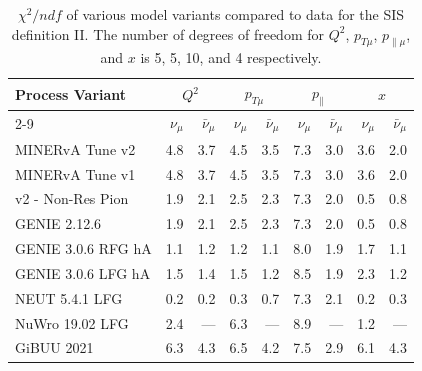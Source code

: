 \documentclass[aps, prd, twocolumn, showpacs, superscriptaddress, floatfix]{revtex4-2}
\begin{document}
\begin{table}[htbp]
	\centering
	\begin{tabular}{lrrrrrrrr}
        \hline\hline
		\multirow{2}{*}{Process Variant}  &	\multicolumn{2}{c}{\textbf{$Q^2$}} & \multicolumn{2}{c}{\textbf{$p_{T\mu}$}} & \multicolumn{2}{c}{\textbf{$p_{\parallel}$}} & \multicolumn{2}{c}{\textbf{$x$}}  \\  \cline{2-9}
		\multicolumn{1}{c}{}  &	$\nu_\mu$	&	$\bar{\nu}_\mu$	& $\nu_\mu$   &  $\bar{\nu}_\mu$	&	$\nu_\mu$	&	$\bar{\nu}_\mu$   & $\nu_\mu$  &  $\bar{\nu}_\mu$     \\	\hline
        MINERvA Tune v2     & 4.8		& 3.7      & 4.5     & 3.5		& 7.3     &	3.0    & 3.6     &	2.0   \\
        MINERvA Tune v1     & 4.8		& 3.7      & 4.5     & 3.5		& 7.3     &	3.0    & 3.6     &	2.0   \\
		v2 - Non-Res Pion   & 1.9		& 2.1	   & 2.5	 & 2.3	    & 7.3     &	2.0    & 0.5     &	0.8   \\ 
		GENIE 2.12.6        & 1.9		& 2.1      & 2.5	 & 2.3	    & 7.3     &	2.0    & 0.5     &  0.8   \\ \hline
		GENIE 3.0.6 RFG hA  & 1.1		& 1.2      & 1.2	 & 1.1		& 8.0     &	1.9    & 1.7     &	1.1   \\
		GENIE 3.0.6 LFG hA  & 1.5		& 1.4      & 1.5	 & 1.2		& 8.5     &	1.9    & 2.3     &	1.2   \\
		NEUT 5.4.1 LFG      & 0.2		& 0.2      & 0.3     & 0.7		& 7.3     & 2.1    & 0.2     &	0.3   \\
		NuWro 19.02 LFG     & 2.4		& ---      & 6.3     & ---      & 8.9     & ---    & 1.2     &	---   \\
        GiBUU 2021          & 6.3		& 4.3      & 6.5     & 4.2      & 7.5     & 2.9    & 6.1     &	4.3   \\  \hline\hline
	\end{tabular}
 	\caption{$\chi^2/ndf$ of various model variants compared to data for the SIS definition II. The number of degrees of freedom for $Q^2$, $p_{T\mu}$, $p_{\parallel\mu}$, and $x$ is 5, 5, 10, and 4 respectively.}
 	\label{Chi2_ModelsData_SISdefinitionII}	
\end{table}
\end{document}
